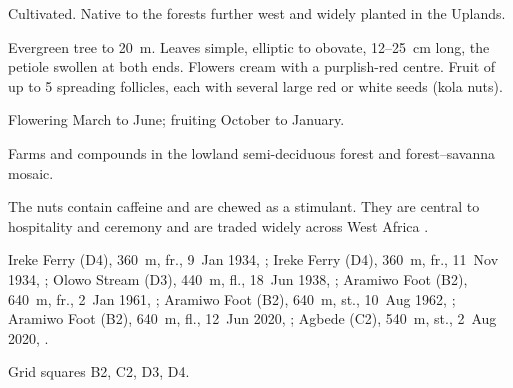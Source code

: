  Cultivated. Native to the forests further west and
widely planted in the Uplands.

 Evergreen tree to 20~m. Leaves simple, elliptic
to obovate, 12--25~cm long, the petiole swollen at both ends. Flowers
cream with a purplish-red centre. Fruit of up to 5 spreading follicles,
each with several large red or white seeds (kola nuts).

 Flowering March to June; fruiting October to
January.

 Farms and compounds in the lowland semi-deciduous
forest and forest--savanna mosaic.

 The nuts contain caffeine and are chewed as a stimulant.
They are central to hospitality and ceremony and are traded widely
across West Africa \citep{keay1989,orwa2009}.

 Ireke Ferry (D4), 360~m, fr., 9~Jan 1934, ;
Ireke Ferry (D4), 360~m, fr., 11~Nov 1934, ;
Olowo Stream (D3), 440~m, fl., 18~Jun 1938, ;
Aramiwo Foot (B2), 640~m, fr., 2~Jan 1961, ;
Aramiwo Foot (B2), 640~m, st., 10~Aug 1962, ;
Aramiwo Foot (B2), 640~m, fl., 12~Jun 2020, ;
Agbede (C2), 540~m, st., 2~Aug 2020, .

 Grid squares B2, C2, D3, D4.

\begin{center}
\end{center}
